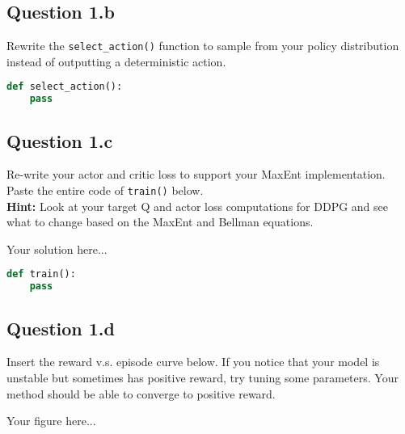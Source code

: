 \documentclass[12pt]{article}
\begin{document}
\subsection*{Question 1.b} 
Rewrite the \texttt{select\_action()} function to sample from your policy distribution instead of outputting a deterministic action.
\begin{solution}
\begin{lstlisting}[language=Python]
def select_action():
    pass
\end{lstlisting}
\end{solution}

\subsection*{Question 1.c} 
Re-write your actor and critic loss to support your MaxEnt implementation. Paste the entire code of \texttt{train()} below.
\\
\textbf{Hint:} Look at your target Q and actor loss computations for DDPG and see what to change based on the MaxEnt and Bellman equations.
\begin{solution}
Your solution here...
\begin{lstlisting}[language=Python]
def train():
    pass
\end{lstlisting}
\end{solution}
\subsection*{Question 1.d}
Insert the reward v.s. episode curve below. If you notice that your model is unstable but sometimes has positive reward, try tuning some parameters. Your method should be able to converge to positive reward.
\begin{solution}
Your figure here...
\end{solution}
\end{document}
